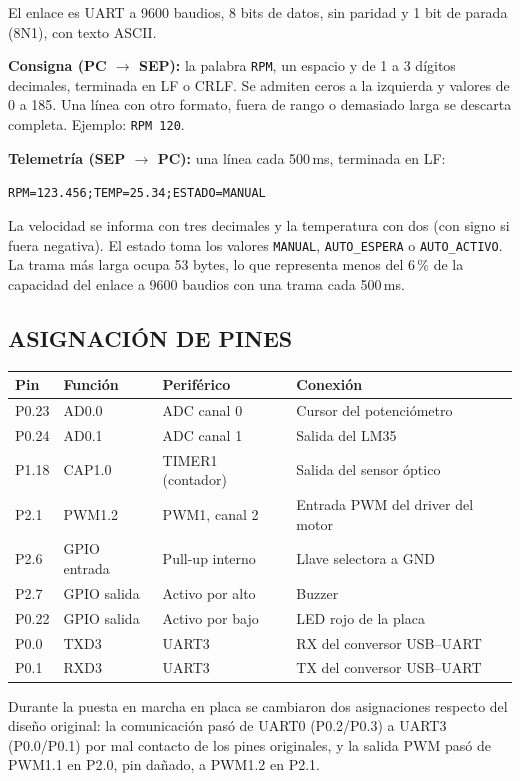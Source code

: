 El enlace es UART a 9600 baudios, 8 bits de datos, sin paridad y 1 bit de parada (8N1),
con texto ASCII.

\textbf{Consigna (PC $\rightarrow$ SEP):} la palabra \texttt{RPM}, un espacio y de 1 a 3
dígitos decimales, terminada en LF o CRLF. Se admiten ceros a la izquierda y valores de 0
a 185. Una línea con otro formato, fuera de rango o demasiado larga se descarta completa.
Ejemplo: \texttt{RPM 120}.

\textbf{Telemetría (SEP $\rightarrow$ PC):} una línea cada 500\,ms, terminada en LF:

\begin{center}
\texttt{RPM=123.456;TEMP=25.34;ESTADO=MANUAL}
\end{center}

La velocidad se informa con tres decimales y la temperatura con dos (con signo si fuera
negativa). El estado toma los valores \texttt{MANUAL}, \texttt{AUTO\_ESPERA} o
\texttt{AUTO\_ACTIVO}. La trama más larga ocupa 53 bytes, lo que representa menos del
6\,\% de la capacidad del enlace a 9600 baudios con una trama cada 500\,ms.

\subsection{ASIGNACIÓN DE PINES}

\begin{longtable}{|p{1.6cm}|p{2.6cm}|p{4.4cm}|p{5.6cm}|}
\hline
\textbf{Pin} & \textbf{Función} & \textbf{Periférico} & \textbf{Conexión} \\ \hline
\endhead
P0.23 & AD0.0 & ADC canal 0 & Cursor del potenciómetro \\ \hline
P0.24 & AD0.1 & ADC canal 1 & Salida del LM35 \\ \hline
P1.18 & CAP1.0 & TIMER1 (contador) & Salida del sensor óptico \\ \hline
P2.1 & PWM1.2 & PWM1, canal 2 & Entrada PWM del driver del motor \\ \hline
P2.6 & GPIO entrada & Pull-up interno & Llave selectora a GND \\ \hline
P2.7 & GPIO salida & Activo por alto & Buzzer \\ \hline
P0.22 & GPIO salida & Activo por bajo & LED rojo de la placa \\ \hline
P0.0 & TXD3 & UART3 & RX del conversor USB--UART \\ \hline
P0.1 & RXD3 & UART3 & TX del conversor USB--UART \\ \hline
\end{longtable}

Durante la puesta en marcha en placa se cambiaron dos asignaciones respecto del diseño
original: la comunicación pasó de UART0 (P0.2/P0.3) a UART3 (P0.0/P0.1) por mal contacto
de los pines originales, y la salida PWM pasó de PWM1.1 en P2.0, pin dañado, a PWM1.2 en
P2.1.
